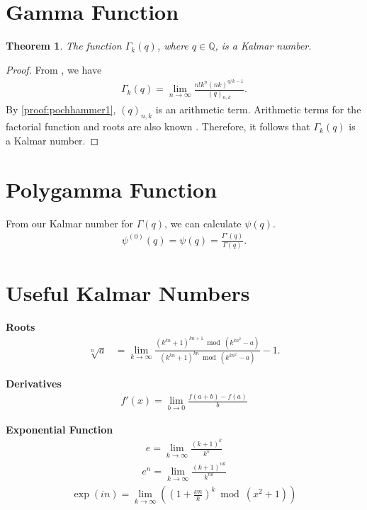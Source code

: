 \documentclass[10pt,a4paper]{article}
\theoremstyle{plain}
\newtheorem{theorem}{Theorem}[section]
\begin{document}
\section{Gamma Function}
\begin{theorem}
The function $\Gamma_k(q)$, where $q \in \mathbb{Q}$, is a Kalmar number.
\end{theorem}
\begin{proof}
From \cite{diaz2005hypergeometric}, we have
\begin{align*}
\Gamma_k(q) = \lim_{n\to\infty} \frac{n! k^n (nk)^{q/k-1}}{(q)_{n,k}} .
\end{align*}
By \cref{proof:pochhammer1}, $(q)_{n,k}$ is an arithmetic term. Arithmetic terms for the factorial function and roots are also known \cite{prunescu2024factorial,shunia2024polynomial}. Therefore, it follows that $\Gamma_k(q)$ is a Kalmar number.
\end{proof}

\section{Polygamma Function}
From our Kalmar number for $\Gamma(q)$, we can calculate $\psi(q)$.
\begin{align*}
\psi^{(0)}(q) =\psi(q) = \frac{\Gamma'(q)}{\Gamma(q)} .
\end{align*}

\section{Useful Kalmar Numbers}

\textbf{Roots}
\begin{align}
\sqrt[n]{a} &= \lim_{k\to\infty}
    \frac{(k^{kn} + 1)^{kn+1} \bmod (k^{kn^2}-a)}
    {(k^{kn} + 1)^{kn} \bmod (k^{kn^2}-a)} - 1 .
\end{align}

\textbf{Derivatives}
\begin{align}
f'(x) = \lim_{b \to 0} \frac{f(a+b) - f(a)}{b}
\end{align}

\textbf{Exponential Function}
\begin{align*}
    e = \lim_{k\rightarrow\infty} \frac{(k+1)^k}{k^k}
\end{align*}
\begin{align*}
    e^n = \lim_{k\rightarrow\infty} \frac{(k+1)^{nk}}{k^{nk}}
\end{align*}
\begin{align*}
\exp(in) = \lim_{k\to\infty} \left(\left(1+\frac{xn}{k} \right)^k \bmod (x^2+1) \right)
\end{align*}
\end{document}
